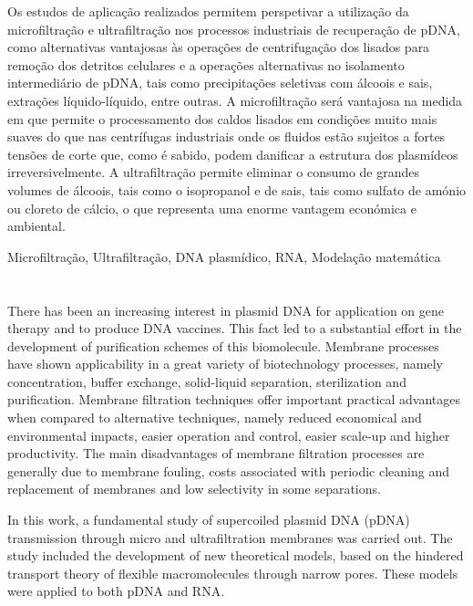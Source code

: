 \documentclass[10pt,twoside]{thesis}
\begin{document}
Os estudos de aplicação realizados permitem perspetivar a utilização da microfiltração e ultrafiltração nos processos industriais de recuperação de pDNA, como alternativas vantajosas às operações de centrifugação dos lisados para remoção dos detritos celulares e a operações alternativas no isolamento intermediário de pDNA, tais como precipitações seletivas com álcoois e sais, extrações líquido-líquido, entre outras. A microfiltração será vantajosa na medida em que permite o processamento dos caldos lisados em condições muito mais suaves do que nas centrífugas industriais onde os fluidos estão sujeitos a fortes tensões de corte que, como é sabido, podem danificar a estrutura dos plasmídeos irreversivelmente. A ultrafiltração permite eliminar o consumo de grandes volumes de álcoois, tais como o isopropanol e de sais, tais como sulfato de amónio ou cloreto de cálcio, o que representa uma enorme vantagem económica e ambiental.

\vspace{0.8cm}
\noindent
{}

\vspace{0.5cm}
\noindent
Microfiltração, Ultrafiltração, DNA plasmídico, RNA, Modelação matemática
\cleardoublepage

\newpage 	
\section*{}
\vspace{0.5cm}
There has been an increasing interest in plasmid DNA for application on gene therapy and to produce DNA vaccines. This fact led to a substantial effort in the development of purification schemes of this biomolecule. Membrane processes have shown applicability in a great variety of biotechnology processes, namely concentration, buffer exchange, solid-liquid separation, sterilization and purification. Membrane filtration techniques offer important practical advantages when compared to alternative techniques, namely reduced economical and environmental impacts, easier operation and control, easier scale-up and higher productivity. The main disadvantages of membrane filtration processes are generally due to membrane fouling, costs associated with periodic cleaning and replacement of membranes and low selectivity in some separations.

In this work, a fundamental study of supercoiled plasmid DNA (pDNA) transmission through micro and ultrafiltration membranes was carried out. The study included the development of new theoretical models, based on the hindered transport theory of flexible macromolecules through narrow pores. These models were applied to both pDNA and RNA.
\end{document}
